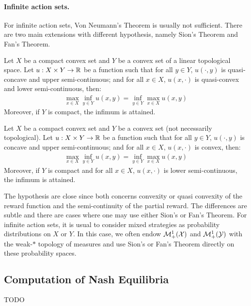 \paragraph{Infinite action sets.} For infinite action sets, Von Neumann's Theorem is usually not sufficient. There are two main extensions with different hypothesis, namely Sion's Theorem and Fan's Theorem.

\begin{thm}
Let $X$ be a compact convex set and $Y$ be a convex set of a linear topological space. Let $u:X\times Y\to\mathbb{R}$ be a function such that for all $y\in Y$, $u(\cdot,y)$ is quasi-concave and upper semi-continuous; and for all $x\in X$, $u(x,\cdot)$ is quasi-convex and lower semi-continuous, then:
\begin{align*}
    \max_{x\in X}\inf_{y\in Y} u(x,y) = \inf_{y\in Y}\max_{x\in X} u(x,y)
\end{align*}
Moreover, if $Y$ is compact, the infimum is attained.
\end{thm}



\begin{thm}
Let $X$ be a compact convex set and $Y$ be a convex set (not necessarily topological). Let $u:X\times Y\to\mathbb{R}$ be a function such that for all $y\in Y$, $u(\cdot,y)$ is concave and upper semi-continuous; and for all $x\in X$, $u(x,\cdot)$ is convex, then:
\begin{align*}
    \max_{x\in X}\inf_{y\in Y} u(x,y) = \inf_{y\in Y}\max_{x\in X} u(x,y)
\end{align*}
Moreover, if $Y$ is compact and for all $x\in X$, $u(x,\cdot)$ is lower semi-continuous, the infimum is attained.
\end{thm}

The hypothesis are close since both concerns convexity or quasi convexity of the reward function and the semi-continuity of the partial reward. The differences are subtle and there are cases where one may use either Sion's or Fan's Theorem. For infinite action sets, it is usual to consider mixed strategies as probability distributions on $X$ or $Y$. In this case, we often endow $\mathcal{M}^1_+(\mathcal{X})$ and $\mathcal{M}^1_+(\mathcal{Y})$ with the weak-$*$ topology of measures and use Sion's or Fan's Theorem directly on these probability spaces.

\subsection{Computation of Nash Equilibria}

TODO



